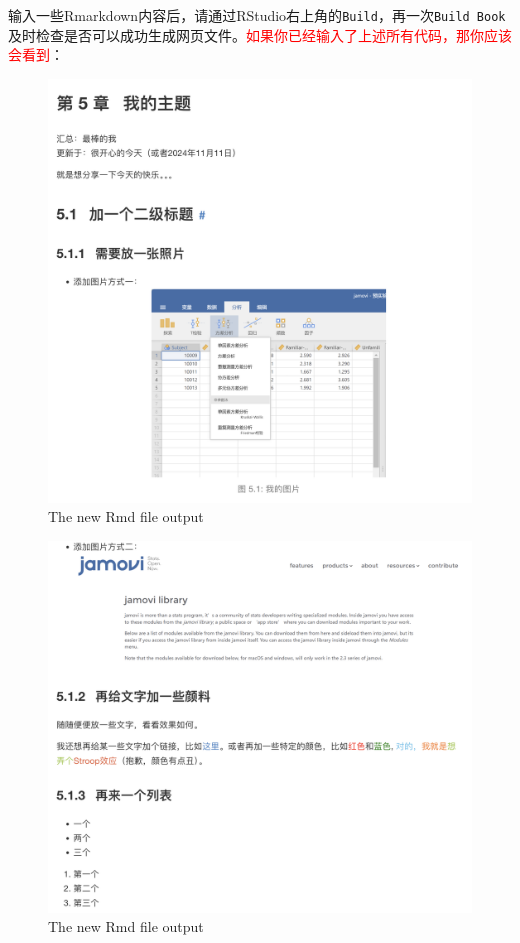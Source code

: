 \documentclass[]{ctexbook}
\theoremstyle{definition}
\theoremstyle{definition}
\theoremstyle{definition}
\theoremstyle{definition}
\theoremstyle{remark}
\begin{document}
输入一些Rmarkdown内容后，请通过RStudio右上角的\texttt{Build}，再一次\texttt{Build\ Book}及时检查是否可以成功生成网页文件。\textcolor{red}{如果你已经输入了上述所有代码，那你应该会看到}：

\begin{figure}

{\centering \includegraphics[width=0.8\linewidth]{img/contribute/new_rmd_output1} 

}

\caption{The new Rmd file output}\label{fig:contri-new-rmd-1}
\end{figure}
\begin{figure}

{\centering \includegraphics[width=0.8\linewidth]{img/contribute/new_rmd_output2} 

}

\caption{The new Rmd file output}\label{fig:contri-new-rmd-2}
\end{figure}
\end{document}
